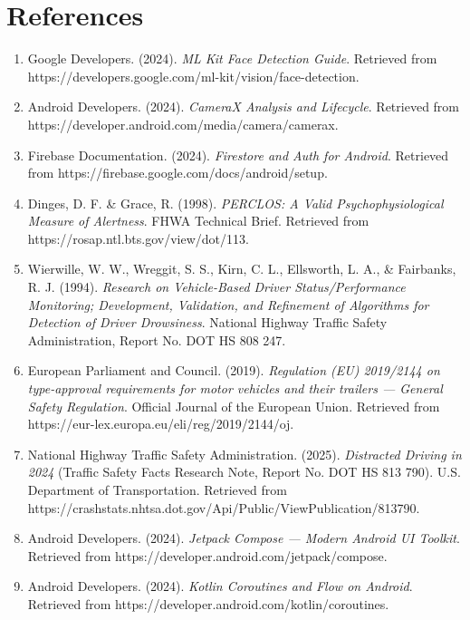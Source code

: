 \documentclass[11pt]{report}
\begin{document}
\clearpage

\chapter{References}
{\sloppy
\begin{enumerate}
    \item \label{google2024mlkit} Google Developers. (2024). \textit{ML Kit Face Detection Guide}. Retrieved from https://developers.google.com/ml-kit/vision/face-detection.
    \item \label{android2024camerax} Android Developers. (2024). \textit{CameraX Analysis and Lifecycle}. Retrieved from https://developer.android.com/media/camera/camerax.
    \item \label{firebase2024docs} Firebase Documentation. (2024). \textit{Firestore and Auth for Android}. Retrieved from https://firebase.google.com/docs/android/setup.
    \item \label{dinges1998perclos} Dinges, D. F. \& Grace, R. (1998). \textit{PERCLOS: A Valid Psychophysiological Measure of Alertness}. FHWA Technical Brief. Retrieved from https://rosap.ntl.bts.gov/view/dot/113.
    \item \label{wierwille1994drowsiness} Wierwille, W. W., Wreggit, S. S., Kirn, C. L., Ellsworth, L. A., \& Fairbanks, R. J. (1994). \textit{Research on Vehicle-Based Driver Status/Performance Monitoring; Development, Validation, and Refinement of Algorithms for Detection of Driver Drowsiness}. National Highway Traffic Safety Administration, Report No. DOT HS 808 247.
    \item \label{eu2019gsr} European Parliament and Council. (2019). \textit{Regulation (EU) 2019/2144 on type-approval requirements for motor vehicles and their trailers --- General Safety Regulation}. Official Journal of the European Union. Retrieved from https://eur-lex.europa.eu/eli/reg/2019/2144/oj.
    \item \label{nhtsa2025distracted} National Highway Traffic Safety Administration. (2025). \textit{Distracted Driving in 2024} (Traffic Safety Facts Research Note, Report No. DOT HS 813 790). U.S. Department of Transportation. Retrieved from https://crashstats.nhtsa.dot.gov/Api/Public/ViewPublication/813790.
    \item \label{android2024compose} Android Developers. (2024). \textit{Jetpack Compose --- Modern Android UI Toolkit}. Retrieved from https://developer.android.com/jetpack/compose.
    \item \label{android2024coroutines} Android Developers. (2024). \textit{Kotlin Coroutines and Flow on Android}. Retrieved from https://developer.android.com/kotlin/coroutines.

\end{enumerate}}
\end{document}
